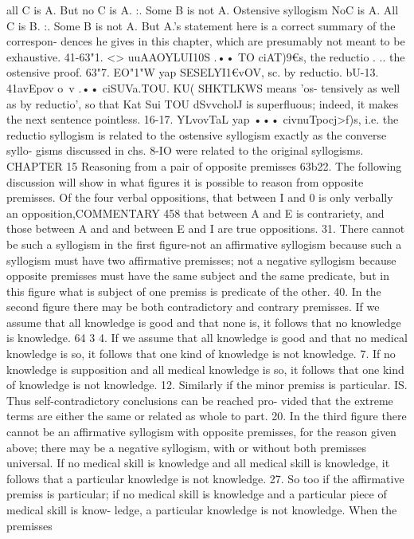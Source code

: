 all C is A.
But no C is A.
:. Some B is not A.
Ostensive syllogism
NoC is A.
All C is B.
:. Some B is not A.
But A.'s statement here is a correct summary of the correspon-
dences he gives in this chapter, which are presumably not meant
to be exhaustive.
41-63"1. <> uuAAOYLUI10S .•• TO ciAT)9€s, the reductio . .. the
ostensive proof.
63"7. EO"1"W yap SESELYI1€vOV, sc. by reductio.
bU-13. 41avEpov o~v .•• ciSUVa.TOU. KU( SHKTLKWS means 'os-
tensively as well as by reductio', so that Kat Sui TOU dSvvcholJ is
superfluous; indeed, it makes the next sentence pointless.
16-17. YLvovTaL yap ••• civnuTpocj>f)s, i.e. the reductio syllogism
is related to the ostensive syllogism exactly as the converse syllo-
gisms discussed in chs. 8-IO were related to the original syllogisms.
CHAPTER 15
Reasoning from a pair of opposite premisses
63b22. The following discussion will show in what figures it is
possible to reason from opposite premisses. Of the four verbal
oppositions, that between I and 0 is only verbally an opposition,COMMENTARY
458
that between A and E is contrariety, and those between A and
and between E and I are true oppositions.
31. There cannot be such a syllogism in the first figure-not an
affirmative syllogism because such a syllogism must have two
affirmative premisses; not a negative syllogism because opposite
premisses must have the same subject and the same predicate,
but in this figure what is subject of one premiss is predicate of the
other.
40. In the second figure there may be both contradictory and
contrary premisses. If we assume that all knowledge is good and
that none is, it follows that no knowledge is knowledge.
64 3 4. If we assume that all knowledge is good and that no
medical knowledge is so, it follows that one kind of knowledge is
not knowledge.
7. If no knowledge is supposition and all medical knowledge is
so, it follows that one kind of knowledge is not knowledge.
12. Similarly if the minor premiss is particular.
IS. Thus self-contradictory conclusions can be reached pro-
vided that the extreme terms are either the same or related as
whole to part.
20. In the third figure there cannot be an affirmative syllogism
with opposite premisses, for the reason given above; there may
be a negative syllogism, with or without both premisses universal.
If no medical skill is knowledge and all medical skill is knowledge,
it follows that a particular knowledge is not knowledge.
27. So too if the affirmative premiss is particular; if no medical
skill is knowledge and a particular piece of medical skill is know-
ledge, a particular knowledge is not knowledge. When the premisses
